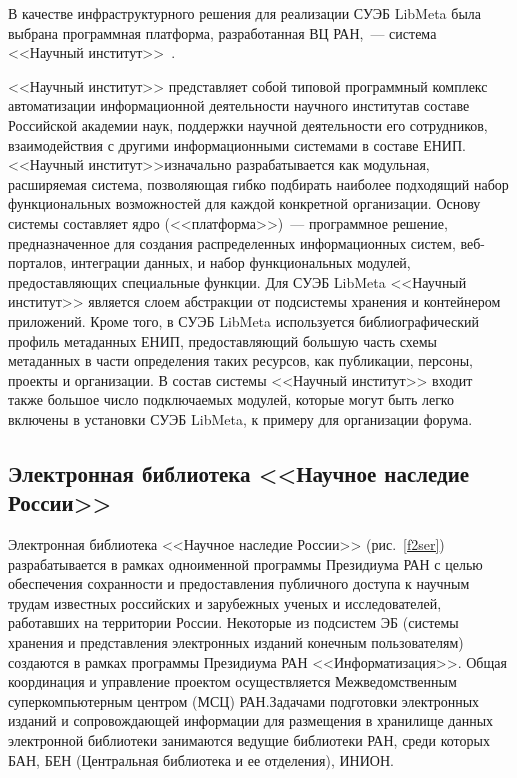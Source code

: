 \begin{multicols}{2}
  В качестве инфраструктурного решения для реализации СУЭБ LibMeta была выбрана 
прог\-рам\-мная платформа, разработанная ВЦ РАН,~--- система <<Научный 
институт>>~\cite{26ser}.
  
  <<Научный институт>> представляет собой типовой программный комплекс 
автоматизации информационной деятельности научного института\linebreak в составе Российской 
академии наук, поддержки научной деятельности его сотрудников, взаимодействия с 
другими информационными сис\-те\-ма\-ми в составе ЕНИП. <<Научный институт>>\linebreak изначально 
разрабатывается как модульная, расширяемая система, позволяющая гибко подбирать 
наиболее подходящий набор функциональных возможностей для каждой конкретной 
организации. Основу системы со\-став\-ля\-ет ядро (<<платформа>>)~--- программное решение, 
предназначенное для создания распределенных информационных систем, веб-порталов, 
интеграции данных, и набор функциональных модулей, предоставляющих специальные 
функции.
  Для СУЭБ LibMeta <<Научный институт>> является слоем абстракции от подсистемы 
хранения и контейнером приложений. Кроме того, в СУЭБ LibMeta используется 
библиографический профиль метаданных ЕНИП, предоставляющий большую часть схемы 
метаданных в части определения таких ресурсов, как публикации, персоны, проекты и 
организации. В состав системы <<Научный институт>> входит также большое число 
подключаемых модулей, которые могут быть легко включены в установки СУЭБ LibMeta, к 
примеру для организации форума. 
  
\vspace*{-6pt}

\subsection{Электронная библиотека <<Научное наследие России>>}
  
Электронная библиотека <<Научное наследие России>> (рис.~\ref{f2ser}) разрабатывается в рамках 
одноименной программы Президиума РАН с целью обеспечения сохранности и 
предоставления пуб\-лич\-но\-го доступа к научным трудам известных российских и зарубежных 
ученых и исследователей, работавших на территории России. Некоторые из подсистем 
ЭБ (системы хранения и представления электронных изданий 
конечным пользователям) создаются в рамках программы Президиума РАН\linebreak 
<<Информатизация>>. Общая координация и управ\-ле\-ние проектом осуществляется 
Межведомственным суперкомпьютерным центром (МСЦ) РАН.\linebreak Задачами подготовки 
электронных изданий и сопровождающей информации для размещения в хранилище данных 
электронной библиотеки занимаются ведущие библиотеки РАН, среди которых БАН, БЕН 
(Центральная библиотека и ее отделения), \mbox{ИНИОН}.


\end{multicols}
